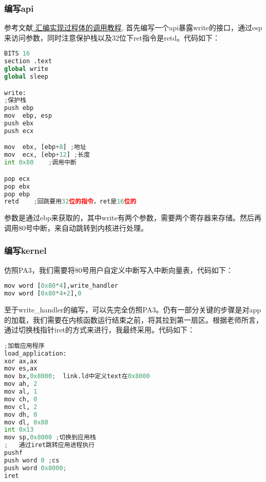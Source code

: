 \documentclass{LabReport}
\begin{document}
	\subsubsection{编写api}
	参考文献\href{https://blog.csdn.net/weixin_43216249/article/details/109827911}{\color{blue} 汇编实现过程体的调用教程}, 首先编写一个api暴露write的接口，通过esp来访问参数，同时注意保护栈以及32位下ret指令是retd。代码如下：
\begin{lstlisting}[language=python,frame=shadowbox]
BITS 16
section .text
global write
global sleep

write:
;保护栈
push ebp
mov  ebp, esp
push ebx
push ecx

mov  ebx, [ebp+8] ;地址
mov  ecx, [ebp+12] ;长度
int 0x80    ;调用中断

pop ecx
pop ebx
pop ebp
retd    ;回跳要用32位的指令，ret是16位的
\end{lstlisting}
参数是通过ebp来获取的，其中write有两个参数，需要两个寄存器来存储。然后再调用80号中断，来自动跳转到内核进行处理。
	
	\subsubsection{编写kernel}
仿照PA3，我们需要将80号用户自定义中断写入中断向量表，代码如下：
\begin{lstlisting}[language=python,frame=shadowbox]
mov word [0x80*4],write_handler
mov word [0x80*4+2],0
\end{lstlisting}
至于write\_handler的编写，可以先完全仿照PA3。仍有一部分关键的步骤是对app的加载，我们需要在内核函数运行结束之前，将其拉到第一扇区。根据老师所言，通过切换栈指针iret的方式来进行，我最终采用。代码如下：
\begin{lstlisting}[language=python,frame=shadowbox]
;加载应用程序
load_application:
xor ax,ax
mov es,ax 
mov bx,0x8000;  link.ld中定义text在0x8000
mov ah, 2    
mov al, 1      
mov ch, 0      
mov cl, 2          
mov dh, 0          
mov dl, 0x80    
int 0x13           
mov sp,0x8000 ;切换到应用栈
;   通过iret跳转应用进程执行
pushf
push word 0 ;cs
push word 0x8000; 
iret 
\end{lstlisting}
\end{document}
